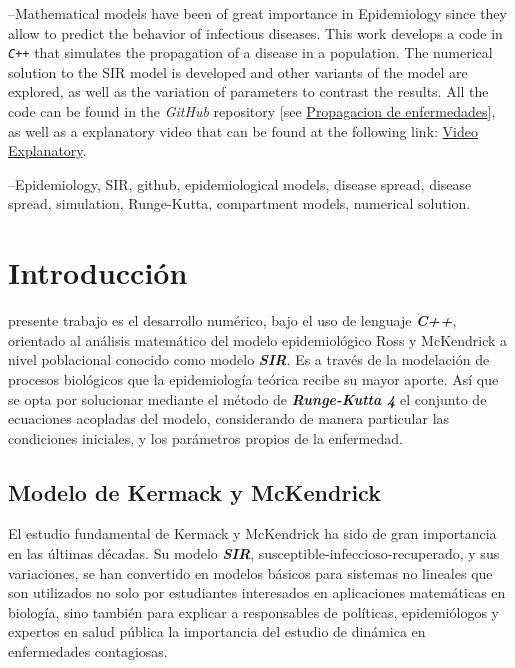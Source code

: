 \documentclass[journal]{IEEEtran}
\begin{document}
\begin{abstracteee}
	--Mathematical models have been of great importance in Epidemiology since they allow
	to predict the behavior of infectious diseases. This work develops a code in \texttt{\textit{C++}}
	that simulates the propagation of a disease in a population. The numerical solution
	to the SIR model is developed and other variants of the model are explored, as well 
	as the variation of parameters to contrast the results. All the code can be found in
	the \emph{GitHub} repository [see \href{https://github.com/niaggar/propagacion-de-enfermedades-project}{Propagacion
	de enfermedades}], as well as a explanatory video
	that can be found at the following link: \href{https://youtu.be/1Z4Z4Z4Z4Z4}{Video Explanatory}.
\end{abstracteee}

\begin{IEEEkeywordsa}
	--Epidemiology, SIR, github, epidemiological models, disease spread, disease spread,
	simulation, Runge-Kutta, compartment models, numerical solution.
\end{IEEEkeywordsa}

\section{Introducción}
 presente trabajo es el desarrollo numérico, bajo el uso de
lenguaje \textbf{\textit{C++}},
orientado al análisis matemático del modelo epidemiológico Ross \cite{Ross} y
McKendrick \cite{Kermack} a nivel poblacional conocido como modelo
\textbf{\textit{SIR}}.
Es a través de la modelación de procesos biológicos que la epidemiología
teórica recibe su mayor aporte.
Así que se opta por solucionar mediante el método de
\textbf{\textit{Runge-Kutta 4}} el conjunto de ecuaciones acopladas del modelo,
considerando de manera particular las condiciones
iniciales, y los parámetros propios de la enfermedad.

\subsection{Modelo de Kermack y McKendrick}

El estudio fundamental de Kermack \cite{Ross} y McKendrick \cite{Kermack} ha
sido de gran importancia en las últimas décadas. Su modelo
\textbf{\textit{SIR}}, susceptible-infeccioso-recuperado, y sus variaciones,
se han convertido en modelos básicos para sistemas no lineales que son
utilizados no solo por estudiantes interesados en aplicaciones matemáticas en
biología,
sino también para explicar a responsables de políticas, epidemiólogos y
expertos en salud pública la importancia del estudio de dinámica en
enfermedades contagiosas.\newline
\end{document}
